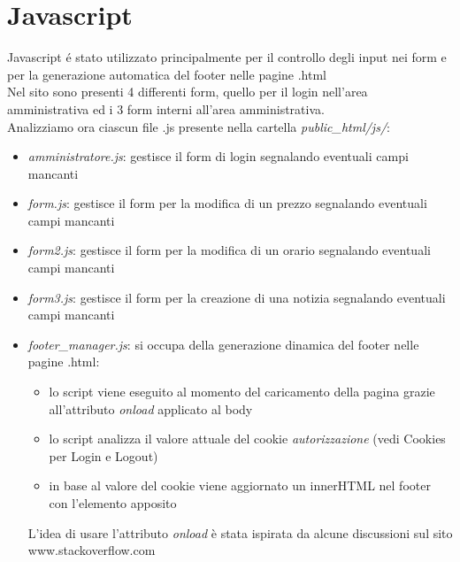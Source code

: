 \documentclass[12pt]{article}
\begin{document}
			\section{Javascript}
				 Javascript \'e stato utilizzato principalmente per il controllo degli input nei form e per la generazione automatica del footer nelle pagine .html\\
				 Nel sito sono presenti 4 differenti form, quello per il login nell'area amministrativa ed i 3 form interni all'area amministrativa. \\
				 Analizziamo ora ciascun file .js presente nella cartella \textit{public\_html/js/}:
				 \begin{itemize}
				 \item \textit{amministratore.js}: gestisce il form di login segnalando eventuali campi mancanti
				 \item \textit{form.js}: gestisce il form per la modifica di un prezzo segnalando eventuali campi mancanti
				 \item \textit{form2.js}: gestisce il form per la modifica di un orario segnalando eventuali campi mancanti
				 \item \textit{form3.js}: gestisce il form per la creazione di una notizia segnalando eventuali campi mancanti
				 \item \textit{footer\_manager.js}: si occupa della generazione dinamica del footer nelle pagine .html:
				 \begin{itemize}
				 \item lo script viene eseguito al momento del caricamento della pagina grazie all'attributo \textit{onload} applicato al body
				 \item lo script analizza il valore attuale del cookie \textit{autorizzazione} (vedi Cookies per Login e Logout)
				 \item in base al valore del cookie viene aggiornato un innerHTML nel footer con l'elemento apposito
				 \end{itemize}
				 L'idea di usare l'attributo \textit{onload} \`e stata ispirata da alcune discussioni sul sito www.stackoverflow.com
				 \end{itemize}
				
	\newpage
\end{document}
